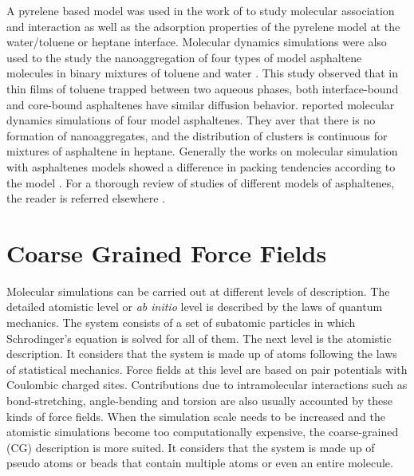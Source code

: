 A pyrelene based model was used in the work of  to study molecular association and interaction as well as the adsorption properties of the pyrelene model at the water/toluene or heptane interface. Molecular dynamics simulations were also used to the study the nanoaggregation of four types of model asphaltene molecules in binary mixtures of toluene and water \cite{doi:10.1021/ef9004576}. This study observed that  in thin films of toluene trapped between two aqueous phases,
both interface-bound and core-bound asphaltenes have similar diffusion behavior.  reported molecular dynamics simulations of four model asphaltenes. They aver that there is no formation of nanoaggregates, and the distribution of clusters is continuous for mixtures of asphaltene in heptane. Generally the works on molecular simulation with asphaltenes models showed a difference in
packing tendencies according to the model \cite{doi:10.1080/10298436.2011.575141}. For a thorough review of studies of different models of asphaltenes, the reader is referred elsewhere \cite{doi:10.1080/10298436.2011.575141}. 


\section{Coarse Grained Force Fields}


Molecular simulations can be carried out at different levels of description. The detailed atomistic level or \textit{ab initio} level is described by the laws of quantum mechanics. The system consists of a set of subatomic particles in which Schrodinger's equation is solved for all of them. The next level is the atomistic description. It considers that the system is made up of atoms following the laws of statistical mechanics.  Force fields at this level are based on pair potentials with Coulombic charged sites. Contributions due to intramolecular interactions such as bond-stretching, angle-bending and torsion are also usually accounted by these kinds of force fields. When the simulation scale needs to be increased and the atomistic simulations become too computationally expensive, the coarse-grained (CG) description is more suited. It considers that the system is made up of pseudo atoms or beads that contain multiple atoms or even an entire molecule. 

